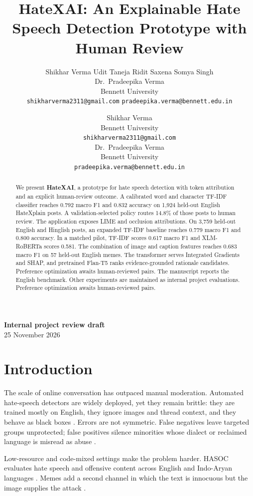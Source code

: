 \documentclass[11pt]{article}
\title{HateXAI: An Explainable Hate Speech Detection Prototype with Human Review}
\author{Shikhar Verma \quad Udit Taneja \quad Ridit Saxena \quad Somya Singh \\
  Dr.\ Pradeepika Verma \\
  Bennett University \\
  \texttt{shikharverma2311@gmail.com} \quad
  \texttt{pradeepika.verma@bennett.edu.in} \\
}
\author{Shikhar Verma \\
  Bennett University \\
  \texttt{shikharverma2311@gmail.com} \\
  \And
  Dr.\ Pradeepika Verma \\
  Bennett University \\
  \texttt{pradeepika.verma@bennett.edu.in} \\
}
\begin{document}
\maketitle

\ifdefined\HateXAIInternal
\begin{center}
\textbf{Internal project review draft}\\
25 November 2026
\end{center}
\fi

\begin{abstract}
We present \textbf{HateXAI}, a prototype for hate speech detection with token attribution and an explicit human-review outcome. A calibrated word and character TF-IDF classifier reaches 0.792 macro F1 and 0.832 accuracy on 1,924 held-out English HateXplain posts. A validation-selected policy routes 14.8\% of those posts to human review. The application exposes LIME and occlusion attributions.
\ifdefined\HateXAIInternal
On 3,759 held-out English and Hinglish posts, an expanded TF-IDF baseline reaches 0.779 macro F1 and 0.800 accuracy. In a matched pilot, TF-IDF scores 0.617 macro F1 and XLM-RoBERTa scores 0.581. The combination of image and caption features reaches 0.683 macro F1 on 57 held-out English memes. The transformer serves Integrated Gradients and SHAP, and pretrained Flan-T5 ranks evidence-grounded rationale candidates. Preference optimization awaits human-reviewed pairs.
\else
The manuscript reports the English benchmark. Other experiments are maintained as internal project evaluations. Preference optimization awaits human-reviewed pairs.
\fi
\end{abstract}

\section{Introduction}

The scale of online conversation has outpaced manual moderation. Automated hate-speech detectors are widely deployed, yet they remain brittle: they are trained mostly on English, they ignore images and thread context, and they behave as black boxes \cite{fortuna2018survey,davidson2017hate,vidgen2020directions}. Errors are not symmetric. False negatives leave targeted groups unprotected; false positives silence minorities whose dialect or reclaimed language is misread as abuse \cite{sap2019racial}.

Low-resource and code-mixed settings make the problem harder. HASOC evaluates hate speech and offensive content across English and Indo-Aryan languages \cite{mandl2021hasoc}. Memes add a second channel in which the text is innocuous but the image supplies the attack \cite{kiela2020hatefulmemes}.
\end{document}
